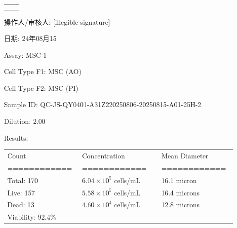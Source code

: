\documentclass[UTF8,10pt,a4paper,fontset=fandol]{ctexart}
\newcommand{\fieldvalue}[1]{#1}
\newcommand{\handwritten}[1]{#1}
\begin{document}
\bigskip

\noindent
\begin{tabular}{@{}p{0.46\linewidth}p{0.46\linewidth}@{}}
\fbox{\rule{0pt}{3.0cm}\rule{0.40\linewidth}{0pt}}
&
\fbox{\rule{0pt}{3.0cm}\rule{0.40\linewidth}{0pt}}
\\[8pt]
\fbox{\rule{0pt}{3.0cm}\rule{0.40\linewidth}{0pt}}
&
\fbox{\rule{0pt}{3.0cm}\rule{0.40\linewidth}{0pt}}
\end{tabular}

\vfill

\noindent
操作人/审核人:
\fieldvalue{\handwritten{[illegible signature]}}

\hfill
日期:
\fieldvalue{\handwritten{24年08月15}}

\newpage

\noindent Assay: MSC-1

\noindent Cell Type F1: MSC (AO)

\noindent Cell Type F2: MSC (PI)

\medskip

\noindent Sample ID: QC-JS-QY0401-A31Z220250806-20250815-A01-25H-2

\noindent Dilution: 2.00

\medskip

\noindent Results:

\medskip

\noindent
\begin{tabular}{@{}p{0.29\linewidth}p{0.33\linewidth}p{0.30\linewidth}@{}}
Count & Concentration & Mean Diameter \\
============ & ============ & ============ \\
Total: 170 & $6.04\times10^{5}$ cells/mL & 16.1 micron \\
Live: 157 & $5.58\times10^{5}$ cells/mL & 16.4 microns \\
Dead: 13 & $4.60\times10^{4}$ cells/mL & 12.8 microns \\
Viability: 92.4\% & & \\
\end{tabular}
\end{document}
